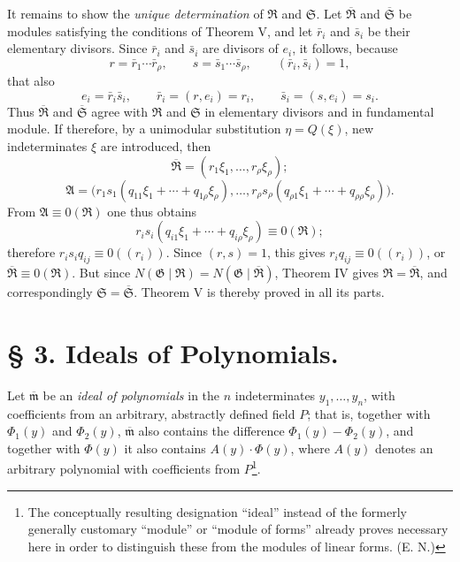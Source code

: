 \documentclass[11pt]{article}
\newcommand{\Amod}{\mathfrak A}
\newcommand{\Gmod}{\mathfrak G}
\newcommand{\Rmod}{\mathfrak R}
\newcommand{\Smod}{\mathfrak S}
\newcommand{\mideal}{\mathfrak m}
\newcommand{\zero}[1]{\equiv 0(#1)}
\newcommand{\Norm}{N}
\begin{document}
It remains to show the \emph{unique determination} of $\Rmod$ and $\Smod$. Let $\overline{\Rmod}$ and $\overline{\Smod}$ be modules satisfying the conditions of Theorem V, and let $\bar r_i$ and $\bar s_i$ be their elementary divisors. Since $\bar r_i$ and $\bar s_i$ are divisors of $e_i$, it follows, because
\[
 r=\bar r_1\cdots\bar r_\rho,
 \qquad
 s=\bar s_1\cdots\bar s_\rho,
 \qquad
 (\bar r_i,\bar s_i)=1,
\]
that also
\[
 e_i=\bar r_i\bar s_i,
 \qquad
 \bar r_i=(r,e_i)=r_i,
 \qquad
 \bar s_i=(s,e_i)=s_i.
\]
Thus $\overline{\Rmod}$ and $\overline{\Smod}$ agree with $\Rmod$ and $\Smod$ in elementary divisors and in fundamental module. If therefore, by a unimodular substitution $\eta=Q(\xi)$, new indeterminates $\xi$ are introduced, then
\[
 \overline{\Rmod}=(r_1\xi_1,\ldots,r_\rho\xi_\rho);
\]
\[
 \Amod=\bigl(r_1s_1(q_{11}\xi_1+\cdots+q_{1\rho}\xi_\rho),\ldots,
 r_\rho s_\rho(q_{\rho1}\xi_1+\cdots+q_{\rho\rho}\xi_\rho)\bigr).
\]
From $\Amod\zero{\Rmod}$ one thus obtains
\[
 r_i s_i(q_{i1}\xi_1+\cdots+q_{i\rho}\xi_\rho)\zero{\Rmod};
\]
therefore $r_is_iq_{ij}\zero{(r_i)}$. Since $(r,s)=1$, this gives $r_iq_{ij}\zero{(r_i)}$, or $\overline{\Rmod}\zero{\Rmod}$. But since $\Norm(\Gmod\mid\Rmod)=\Norm(\Gmod\mid\overline{\Rmod})$, Theorem IV gives $\Rmod=\overline{\Rmod}$, and correspondingly $\Smod=\overline{\Smod}$. Theorem V is thereby proved in all its parts.

\section*{§ 3. Ideals of Polynomials.}

Let $\overline{\mideal}$ be an \emph{ideal of polynomials} in the $n$ indeterminates $y_1,\ldots,y_n$, with coefficients from an arbitrary, abstractly defined field $P$; that is, together with $\Phi_1(y)$ and $\Phi_2(y)$, $\overline{\mideal}$ also contains the difference $\Phi_1(y)-\Phi_2(y)$, and together with $\Phi(y)$ it also contains $A(y)\cdot\Phi(y)$, where $A(y)$ denotes an arbitrary polynomial with coefficients from $P$\footnote{The conceptually resulting designation ``ideal'' instead of the formerly generally customary ``module'' or ``module of forms'' already proves necessary here in order to distinguish these from the modules of linear forms. (E. N.)}.
\end{document}
